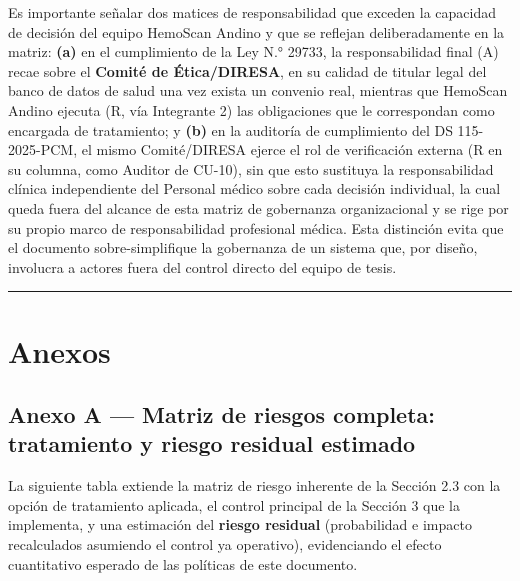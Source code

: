 \documentclass[11pt,a4paper]{article}
\begin{document}
Es importante señalar dos matices de responsabilidad que exceden la capacidad de decisión del equipo HemoScan Andino y que se reflejan deliberadamente en la matriz: \textbf{(a)} en el cumplimiento de la Ley N.° 29733, la responsabilidad final (A) recae sobre el \textbf{Comité de Ética/DIRESA}, en su calidad de titular legal del banco de datos de salud una vez exista un convenio real, mientras que HemoScan Andino ejecuta (R, vía Integrante 2) las obligaciones que le correspondan como encargada de tratamiento; y \textbf{(b)} en la auditoría de cumplimiento del DS 115-2025-PCM, el mismo Comité/DIRESA ejerce el rol de verificación externa (R en su columna, como Auditor de CU-10), sin que esto sustituya la responsabilidad clínica independiente del Personal médico sobre cada decisión individual, la cual queda fuera del alcance de esta matriz de gobernanza organizacional y se rige por su propio marco de responsabilidad profesional médica. Esta distinción evita que el documento sobre-simplifique la gobernanza de un sistema que, por diseño, involucra a actores fuera del control directo del equipo de tesis.

\begin{center}\rule{0.5\linewidth}{0.5pt}\end{center}

\section{Anexos}\label{anexos}

\subsection{Anexo A --- Matriz de riesgos completa: tratamiento y riesgo residual estimado}\label{anexo-a-matriz-de-riesgos-completa-tratamiento-y-riesgo-residual-estimado}

La siguiente tabla extiende la matriz de riesgo inherente de la Sección 2.3 con la opción de tratamiento aplicada, el control principal de la Sección 3 que la implementa, y una estimación del \textbf{riesgo residual} (probabilidad e impacto recalculados asumiendo el control ya operativo), evidenciando el efecto cuantitativo esperado de las políticas de este documento.
\end{document}
